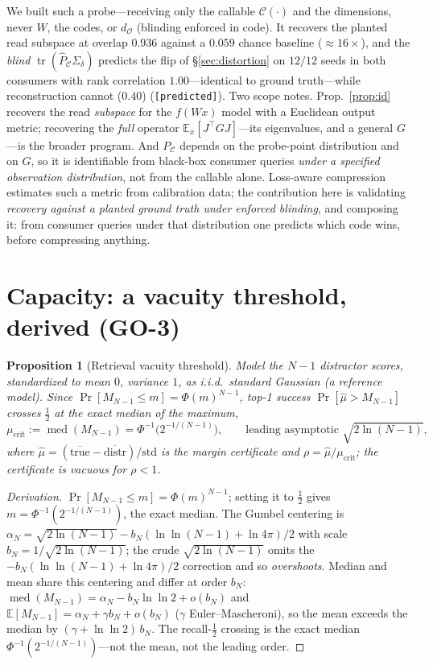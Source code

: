 \documentclass[11pt]{article}
\newtheorem{proposition}{Proposition}
\theoremstyle{definition}
\theoremstyle{remark}
\newcommand{\PC}{P_{\mathcal{C}}}
\newcommand{\Sd}{\Sigma_{\delta}}
\newcommand{\tr}{\operatorname{tr}}
\newcommand{\dO}{d_{\mathcal{O}}}
\newcommand{\E}{\mathbb{E}}
\begin{document}
We built such a probe---receiving only the callable $\mathcal{C}(\cdot)$ and the
dimensions, never $W$, the codes, or $\dO$ (blinding enforced in code). It recovers
the planted read subspace at overlap $0.936$ against a $0.059$ chance baseline
($\approx16\times$), and the \emph{blind} $\tr(\hat\PC\Sd)$ predicts the flip of
\S\ref{sec:distortion} on $12/12$ seeds in both consumers with rank correlation
$1.00$---identical to ground truth---while reconstruction cannot ($0.40$)
(\texttt{[predicted]}). Two scope notes. Prop.~\ref{prop:id} recovers the read \emph{subspace} for the
$f(Wx)$ model with a Euclidean output metric; recovering the \emph{full} operator
$\E_x[J^\top G J]$---its eigenvalues, and a general $G$---is the broader program.
And $\PC$ depends on the probe-point distribution and on $G$, so it is identifiable
from black-box consumer queries \emph{under a specified observation distribution},
not from the callable alone. Loss-aware compression estimates such a metric from
calibration data; the contribution here is validating \emph{recovery against a
planted ground truth under enforced blinding}, and composing it: from consumer
queries under that distribution one predicts which code wins, before compressing
anything.

\section{Capacity: a vacuity threshold, derived (GO-3)}\label{sec:capacity}

\begin{proposition}[Retrieval vacuity threshold]\label{prop:capacity}
Model the $N\!-\!1$ distractor scores, standardized to mean $0$, variance $1$, as
i.i.d.\ standard Gaussian (a reference model). Since $\Pr[M_{N-1}\le m]=\Phi(m)^{N-1}$,
top-1 success $\Pr[\hat\mu>M_{N-1}]$ crosses $\tfrac12$ at the \emph{exact median}
of the maximum,
\[
\mu_{\mathrm{crit}}:=\operatorname{med}(M_{N-1})=\Phi^{-1}\!\big(2^{-1/(N-1)}\big),
\qquad \text{leading asymptotic }\sqrt{2\ln(N{-}1)},
\]
where $\hat\mu=(\overline{\text{true}}-\overline{\text{distr}})/\mathrm{std}$ is the
margin certificate and $\rho=\hat\mu/\mu_{\mathrm{crit}}$; the certificate is
\emph{vacuous} for $\rho<1$.
\end{proposition}
\begin{proof}[Derivation]
$\Pr[M_{N-1}\le m]=\Phi(m)^{N-1}$; setting it to $\tfrac12$ gives $m=\Phi^{-1}(2^{-1/(N-1)})$,
the exact median. The Gumbel centering is $\alpha_N=\sqrt{2\ln(N{-}1)}-b_N(\ln\ln(N{-}1)
+\ln4\pi)/2$ with scale $b_N=1/\sqrt{2\ln(N{-}1)}$; the crude $\sqrt{2\ln(N{-}1)}$
omits the $-b_N(\ln\ln(N{-}1)+\ln4\pi)/2$ correction and so \emph{overshoots}. Median
and mean share this centering and differ at order $b_N$:
$\operatorname{med}(M_{N-1})=\alpha_N-b_N\ln\ln2+o(b_N)$ and
$\E[M_{N-1}]=\alpha_N+\gamma b_N+o(b_N)$ ($\gamma$ Euler--Mascheroni), so the mean
exceeds the median by $(\gamma+\ln\ln2)\,b_N$. The recall-$\tfrac12$ crossing is the
exact median $\Phi^{-1}(2^{-1/(N-1)})$---not the mean, not the leading order.
\end{proof}
\end{document}
